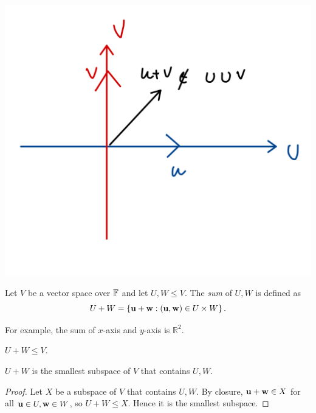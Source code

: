 \documentclass[a4paper]{article}
\begin{document}
\begin{center}
    \includegraphics[scale=0.13]{la1.jpeg}
\end{center}

\begin{definition}
    Let $V$ be a vector space over ${\mathbb{F}}$ and let $U,W\le V$. The \textit{sum} of $U,W$ is defined as 
    \[
        U+W  =\left\{ {\bf u}+{\bf w}: ({\bf u},{\bf w})\in U\times W \right\}.
    \] 
\end{definition}
For example, the sum of $x$-axis and $y$-axis is $ \mathbb{R}^{2} $.

\begin{proposition}
    $U+W\le V$.
\end{proposition}
\begin{proposition}
    $U+W$ is the smallest subspace of $V$ that contains $U,W$.
\end{proposition}
\begin{proof}
    Let $X$ be a subspace of $V$ that contains $U,W$. By closure, $ {\bf u}+{\bf w}\in X $ for all $ {\bf u}\in U,{\bf w}\in W $, so $ U+W\le X $. Hence it is the smallest subspace.
\end{proof}
\end{document}
